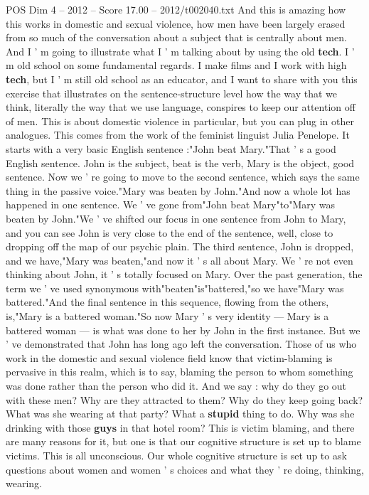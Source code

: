 \begin{textsample}{POS Dim 4 – 2012 – Score 17.00 – 2012/t002040.txt}
And this is amazing how this works in domestic and sexual violence, how men have been largely erased from so much of the conversation about a subject that is centrally about men.
And I ' m going to illustrate what I ' m talking about by using the old \textbf{tech}.
I ' m old school on some fundamental regards.
I make films and I work with high \textbf{tech}, but I ' m still old school as an educator, and I want to share with you this exercise that illustrates on the sentence-structure level how the way that we think, literally the way that we use language, conspires to keep our attention off of men.
This is about domestic violence in particular, but you can plug in other analogues.
This comes from the work of the feminist linguist Julia Penelope.
It starts with a very basic English sentence :"John beat Mary."That ' s a good English sentence.
John is the subject, beat is the verb, Mary is the object, good sentence.
Now we ' re going to move to the second sentence, which says the same thing in the passive voice."Mary was beaten by John."And now a whole lot has happened in one sentence.
We ' ve gone from"John beat Mary"to"Mary was beaten by John."We ' ve shifted our focus in one sentence from John to Mary, and you can see John is very close to the end of the sentence, well, close to dropping off the map of our psychic plain.
The third sentence, John is dropped, and we have,"Mary was beaten,"and now it ' s all about Mary.
We ' re not even thinking about John, it ' s totally focused on Mary.
Over the past generation, the term we ' ve used synonymous with"beaten"is"battered,"so we have"Mary was battered."And the final sentence in this sequence, flowing from the others, is,"Mary is a battered woman."So now Mary ' s very identity — Mary is a battered woman — is what was done to her by John in the first instance.
But we ' ve demonstrated that John has long ago left the conversation.
Those of us who work in the domestic and sexual violence field know that victim-blaming is pervasive in this realm, which is to say, blaming the person to whom something was done rather than the person who did it.
And we say : why do they go out with these men?
Why are they attracted to them?
Why do they keep going back?
What was she wearing at that party?
What a \textbf{stupid} thing to do.
Why was she drinking with those \textbf{guys} in that hotel room?
This is victim blaming, and there are many reasons for it, but one is that our cognitive structure is set up to blame victims.
This is all unconscious.
Our whole cognitive structure is set up to ask questions about women and women ' s choices and what they ' re doing, thinking, wearing.

\end{textsample}
